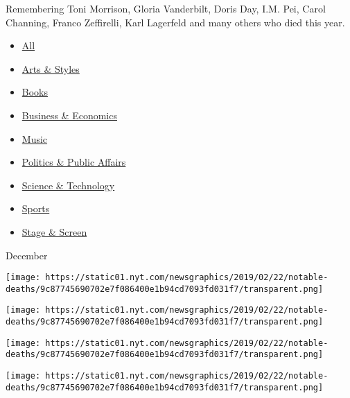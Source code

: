 Remembering Toni Morrison, Gloria Vanderbilt, Doris Day, I.M. Pei, Carol
Channing, Franco Zeffirelli, Karl Lagerfeld and many others who died
this year.

\begin{itemize}
\tightlist
\item
  \href{notable-deaths.html}{All}
\item
  \href{notable-deaths-arts-styles.html}{Arts \& Styles}
\item
  \href{notable-deaths-books.html}{Books}
\item
  \href{notable-deaths-business-economics.html}{Business \& Economics}
\item
  \href{notable-deaths-music.html}{Music}
\item
  \href{notable-deaths-politics-public-affairs.html}{Politics \& Public
  Affairs}
\item
  \href{notable-deaths-science-technology.html}{Science \& Technology}
\item
  \href{notable-deaths-sports.html}{Sports}
\item
  \href{notable-deaths-stage-screen.html}{Stage \& Screen}
\end{itemize}

December

\href{https://www.nytimes.com/2019/12/31/us/gen-paul-x-kelley-dead.html}{}

\texttt{[image: https://static01.nyt.com/newsgraphics/2019/02/22/notable-deaths/9c87745690702e7f086400e1b94cd7093fd031f7/transparent.png]}

\href{https://www.nytimes.com/2019/12/31/books/gertrude-himmelfarb-dead.html}{}

\texttt{[image: https://static01.nyt.com/newsgraphics/2019/02/22/notable-deaths/9c87745690702e7f086400e1b94cd7093fd031f7/transparent.png]}

\href{https://www.nytimes.com/2019/12/31/books/sonny-mehta-dead.html}{}

\texttt{[image: https://static01.nyt.com/newsgraphics/2019/02/22/notable-deaths/9c87745690702e7f086400e1b94cd7093fd031f7/transparent.png]}

\href{https://www.nytimes.com/2019/12/30/arts/music/neil-innes-dead.html}{}

\texttt{[image: https://static01.nyt.com/newsgraphics/2019/02/22/notable-deaths/9c87745690702e7f086400e1b94cd7093fd031f7/transparent.png]}

\href{https://www.nytimes.com/2019/12/28/obituaries/fred-graham-dead.html}{}

